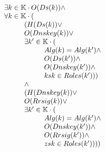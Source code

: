 \documentclass[twoside,english, a4paper]{article}
\begin{document}

\begin{equation}
\begin{array}{l}
				\exists k \in \mathbb{K} \cdot O(Ds(k))
				\wedge \\
				\forall k \in \mathbb{K} \cdot (\\
\hskip 1cm			(H(Ds(k)) \vee \\
\hskip 1cm			O(Dnskey(k)) \vee \\
\hskip 1cm				\exists k' \in \mathbb{K} \cdot (\\
\hskip 2cm				Alg(k) = Alg(k') \wedge \\
\hskip 2cm				O(Ds(k')) \wedge \\
\hskip 2cm				O(Dnskey(k')) \wedge \\
\hskip 2cm				ksk \in Roles(k'))) \\
\hskip 1cm			\wedge\\
\hskip 1cm			(H(Dnskey(k)) \vee \\
\hskip 1cm			O(Rrsig(k)) \vee \\
\hskip 1cm			\exists k' \in \mathbb{K} \cdot (\\
\hskip 2cm				Alg(k) = Alg(k') \wedge \\
\hskip 2cm				O(Dnskey(k')) \wedge \\
\hskip 2cm				O(Rrsig(k')) \wedge \\
\hskip 2cm				zsk \in Roles(k'))))
\end{array}
\end{equation}
\end{document}
